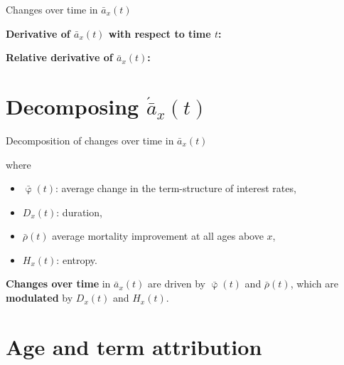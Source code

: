 \documentclass[10pt]{beamer}
\begin{document}
\begin{frame}{Changes over time in $\bar{a}_x(t)$}

\textbf{Derivative of $\bar{a}_x(t)$ with respect to time $t$:}

\begin{center}
	\pause
\end{center}

\textbf{Relative derivative of $\bar{a}_x(t)$:}

\begin{center}
\end{center}

\end{frame}

\section{Decomposing $\acute{\bar{a}}_x(t)$}


\begin{frame}{Decomposition of changes over time in $\bar{a}_x(t)$}

\begin{center}
	\pause
\end{center}

where

\begin{itemize}
	
	\item $\bar{\upvarphi}(t)$: average change in the term-structure of interest rates, \pause
	\item ${D}_x(t)$: duration,	\pause
	\item $\bar{\rho}(t)$ average mortality improvement at all ages above $x$, \pause
	\item ${H}_x(t)$: entropy. \pause
\end{itemize}


\textbf{Changes over time} in $\bar{a}_x(t)$ are driven by $\bar{\upvarphi}(t)$ and $\bar{\rho}(t)$, which are \textbf{modulated} by  ${D}_x(t)$ and ${H}_x(t)$.
\end{frame}





\section{Age and term attribution}
\end{document}
